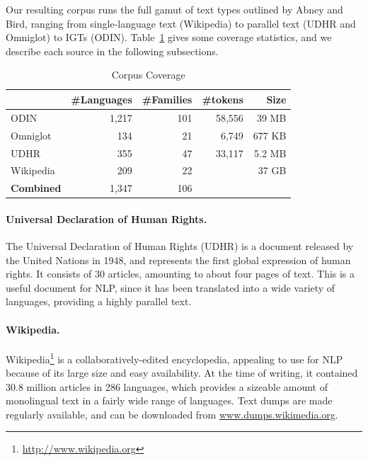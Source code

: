 Our resulting corpus runs the full gamut of text types outlined by Abney and Bird, ranging from single-language text (Wikipedia) to parallel text (UDHR and Omniglot) to IGTs (ODIN).  Table~\ref{table:corpus} gives some coverage statistics, and we describe each source in the following subsections.


\begin{table}[t]
\small
\centering
    \begin{tabular}{l|rr|rr}
    ~         				& \#Languages & \#Families 	&\#tokens		& Size	\\ \hline
    ODIN      				& 1,217      & 101       		& 58,556		& 39 MB		\\
    Omniglot  				& 134        & 21        		&	6,749			& 677 KB	\\
    UDHR      				& 355        & 47        		&	33,117		& 5.2 MB	\\
    Wikipedia 				& 209        & 22       		&						& 37 GB		\\ \hline
    \textbf{Combined}	& 1,347			 & 106 
    \end{tabular}
\caption{Corpus Coverage}
\label{table:corpus}
\end{table}



\paragraph{Universal Declaration of Human Rights.}

The Universal Declaration of Human Rights (UDHR) is a document released by the United Nations in 1948, and represents the first global expression of human rights. It consists of 30 articles, amounting to about four pages of text. This is a useful document for NLP, since it has been translated into a wide variety of languages, providing a highly parallel text.


\paragraph{Wikipedia.}

Wikipedia\footnote{\url{http://www.wikipedia.org}} is a collaboratively-edited encyclopedia, appealing to use for NLP because of its large size and easy availability. At the time of writing, it contained 30.8 million articles in 286 languages, which provides a sizeable amount of monolingual text in a fairly wide range of languages. Text dumps are made regularly available, and can be downloaded from \url{www.dumps.wikimedia.org}.

